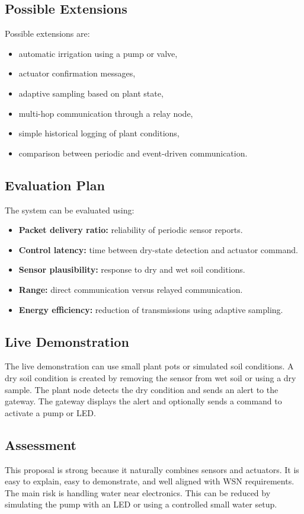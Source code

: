\documentclass[11pt,a4paper]{article}
\newcommand{\projecttitle}[1]{\subsection*{#1}}
\begin{document}
\projecttitle{Possible Extensions}

Possible extensions are:

\begin{itemize}
    \item automatic irrigation using a pump or valve,
    \item actuator confirmation messages,
    \item adaptive sampling based on plant state,
    \item multi-hop communication through a relay node,
    \item simple historical logging of plant conditions,
    \item comparison between periodic and event-driven communication.
\end{itemize}

\projecttitle{Evaluation Plan}

The system can be evaluated using:

\begin{itemize}
    \item \textbf{Packet delivery ratio:} reliability of periodic sensor reports.
    \item \textbf{Control latency:} time between dry-state detection and actuator command.
    \item \textbf{Sensor plausibility:} response to dry and wet soil conditions.
    \item \textbf{Range:} direct communication versus relayed communication.
    \item \textbf{Energy efficiency:} reduction of transmissions using adaptive sampling.
\end{itemize}

\projecttitle{Live Demonstration}

The live demonstration can use small plant pots or simulated soil conditions. A dry soil condition is created by removing the sensor from wet soil or using a dry sample. The plant node detects the dry condition and sends an alert to the gateway. The gateway displays the alert and optionally sends a command to activate a pump or LED.

\projecttitle{Assessment}

This proposal is strong because it naturally combines sensors and actuators. It is easy to explain, easy to demonstrate, and well aligned with WSN requirements. The main risk is handling water near electronics. This can be reduced by simulating the pump with an LED or using a controlled small water setup.
\end{document}
